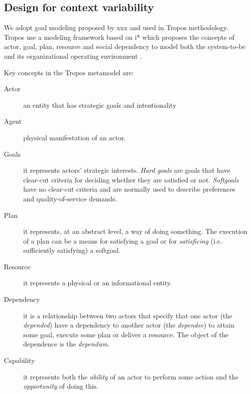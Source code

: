 \subsection{Design for context variability}

We adopt goal modeling proposed by xxx and used in Tropos methodology. Tropos use a modeling framework based on i* \cite{yu_modelling_1996} which proposes the concepts of actor, goal, plan, resource and social dependency to model both the system-to-be and its organizational operating environment \cite{bresciani_tropos:_2004} \cite{morandini_tropos_2014}.

Key concepts in the Tropos metamodel are:

\begin{description}%
  \item[Actor] an entity that has strategic goals and intentionality

  \item[Agent] physical manifestation of an actor.

  \item[Goals] it represents actors’ strategic interests. \emph{Hard goals} are goals that have clear-cut criteria for deciding whether they are satisfied or not. \emph{Softgoals} have no clear-cut criteria and are normally used to describe preferences and quality-of-service demands.

  \item[Plan] it represents, at an abstract level, a way of doing something. The execution of a plan can be a means for satisfying a goal or for \emph{satisficing} (i.e. sufficiently satisfying) a softgoal.

  \item[Resource]  it represents a physical or an informational entity.

  \item[Dependency] it is a relationship between two actors that specify that one actor (the \emph{depended}) have a dependency to another actor (the \emph{dependee}) to attain some goal, execute some plan or deliver a resource. The object of the dependence is the \emph{dependum}.

  \item[Capability] it represents both the \emph{ability} of an actor to perform some action and the \emph{opportunity} of doing this.


\end{description}

